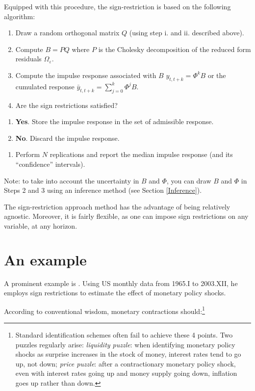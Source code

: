 \documentclass[
  12pt,
]{book}
\providecommand{\tightlist}{%
  \setlength{\itemsep}{0pt}\setlength{\parskip}{0pt}}
\theoremstyle{definition}
\theoremstyle{definition}
\theoremstyle{definition}
\theoremstyle{definition}
\theoremstyle{remark}
\begin{document}
Equipped with this procedure, the sign-restriction is based on the following algorithm:

\begin{enumerate}
\def\labelenumi{\arabic{enumi}.}
\tightlist
\item
  Draw a random orthogonal matrix \(Q\) (using step i. and ii. described above).
\item
  Compute \(B = PQ\) where \(P\) is the Cholesky decomposition of the reduced form residuals \(\Omega_{\varepsilon}\).
\item
  Compute the impulse response associated with \(B\) \(y_{t,t+k}=\Phi^kB\) or the cumulated response \(\bar y_{t,t+k}=\sum_{j=0}^{k}\Phi^jB\).
\item
  Are the sign restrictions satisfied?
\end{enumerate}

\begin{enumerate}
\def\labelenumi{\alph{enumi}.}
\tightlist
\item
  \textbf{Yes}. Store the impulse response in the set of admissible response.
\item
  \textbf{No}. Discard the impulse response.
\end{enumerate}

\begin{enumerate}
\def\labelenumi{\arabic{enumi}.}
\setcounter{enumi}{4}
\tightlist
\item
  Perform \(N\) replications and report the median impulse response (and its ``confidence'' intervals).
\end{enumerate}

Note: to take into account the uncertainty in \(B\) and \(\Phi\), you can draw \(B\) and \(\Phi\) in Steps 2 and 3 using an inference method (see Section \ref{Inference}).

The sign-restriction approach method has the advantage of being relatively agnostic. Moreover, it is fairly flexible, as one can impose sign restrictions on any variable, at any horizon.

\hypertarget{an-example}{%
\section{An example}\label{an-example}}

A prominent example is \citet{Uhlig_2005}. Using US monthly data from 1965.I to 2003.XII, he employs sign restrictions to estimate the effect of monetary policy shocks.

According to conventional wisdom, monetary contractions should:\footnote{Standard identification schemes often fail to achieve these 4 points. Two puzzles regularly arise: \emph{liquidity puzzle}: when identifying monetary policy shocks as surprise increases in the stock of money, interest rates tend to go up, not down; \emph{price puzzle}: after a contractionary monetary policy shock, even with interest rates going up and money supply going down, inflation goes up rather than down.}
\end{document}
